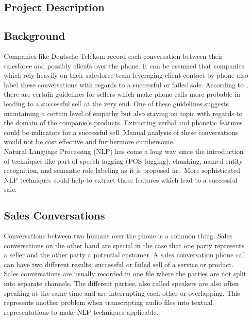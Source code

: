 \documentclass[twoside]{article}
\begin{document}
\begin{multicols}{2}



\section{Project Description}

\subsection{Background}

Companies like Deutsche Telekom record each conversation between their salesforce and possibly clients over the phone. It can be assumed that  companies which rely heavily on their salesforce team leveraging client contact by phone also label these conversations with regards to a successful or failed sale. According to \cite{effectiveSalesConversations2018}, there are certain guidelines for sellers which make phone calls more probable in leading to a successful sell at the very end. One of these guidelines suggests maintaining a certain level of empathy but also staying on topic with regards to the domain of the companie's products. Extracting verbal and phonetic features could be indicators for a successful sell. Manual analysis of these conversations would not be cost effective and furthermore cumbersome.\\
Natural Language Processing (NLP) has come a long way since the introduction of techniques like part-of-speech tagging (POS tagging), chunking, named entity recognition, and semantic role labeling as it is proposed in \cite{Collobert2011}. More sophisticated NLP techniques could help to extract those features which lead to a successful sale.


\subsection{Sales Conversations}

Conversations between two humans over the phone is a common thing. Sales conversations on the other hand are special in the case that one party represents a seller and the other party a potential customer. A sales conversation phone call can have two different results: successful or failed sell of a service or product. Sales conversations are usually recorded in one file where the parties are not split into separate channels. The different parties, also called speakers are also often speaking at the same time and are interrupting each other or overlapping. This represents another problem when transcripting audio files into textual representations to make NLP techniques applicable. 



\end{multicols}
\end{document}
